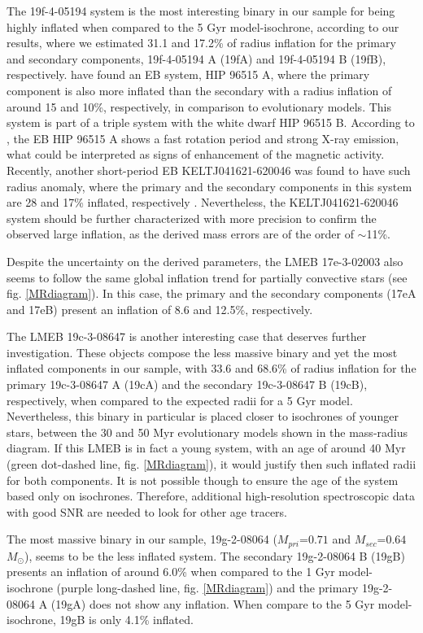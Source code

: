 \documentclass[fleqn,usenatbib]{mnras}
\begin{document}
The 19f-4-05194 system is the most interesting binary in our sample for being highly inflated when compared to the 5 Gyr model-isochrone, according to our results, where we estimated 31.1 and 17.2\% of radius inflation for the primary and secondary components, 19f-4-05194 A (19fA) and 19f-4-05194 B (19fB), respectively. \citet{Huelamo09} have found an EB system, HIP 96515 A, where the primary component is also more inflated than the secondary with a radius inflation of around 15 and 10\%, respectively, in comparison to evolutionary models. This system is part of a triple system with the white dwarf HIP 96515 B. According to \citet{Huelamo09}, the EB HIP 96515 A shows a fast rotation period and strong X-ray emission, what could be interpreted as signs of enhancement of the magnetic activity. 
Recently, another short-period EB KELTJ041621-620046 was found to have such radius anomaly, where the primary and the secondary components in this system are 28 and 17\% inflated, respectively \citep{Lubin17}. Nevertheless, the KELTJ041621-620046 system should be further characterized with more precision to confirm the observed large inflation, as the derived mass errors are of the order of $\sim$11\%.

Despite the uncertainty on the derived parameters, the LMEB 17e-3-02003 also seems to follow the same global inflation trend for partially convective stars (see fig. \ref{MRdiagram}). In this case, the primary and the secondary components (17eA and 17eB) present an inflation of 8.6 and 12.5\%, respectively.

The LMEB 19c-3-08647 is another interesting case that deserves further investigation. These objects compose the less massive binary and yet the most inflated components in our sample, with 33.6 and 68.6\% of radius inflation for the primary 19c-3-08647 A (19cA) and the secondary 19c-3-08647 B (19cB), respectively, when compared to the expected radii for a 5 Gyr model. Nevertheless, this binary in particular is placed closer to isochrones of younger stars, between the 30 and 50 Myr evolutionary models shown in the mass-radius diagram. If this LMEB is in fact a young system, with an age of around 40 Myr (green dot-dashed line, fig. \ref{MRdiagram}), it would justify then such inflated radii for both components. 
It is not possible though to ensure the age of the system based only on isochrones. 
Therefore, additional high-resolution spectroscopic data with good SNR are needed to look for other age tracers.

The most massive binary in our sample, 19g-2-08064 ($M_{pri}$=$0.71$ and $M_{sec}$=$0.64$ $M_{\odot}$), seems to be the less inflated system. The secondary 19g-2-08064 B (19gB) presents an inflation of around 6.0\% when compared to the 1 Gyr model-isochrone (purple long-dashed line, fig. \ref{MRdiagram}) and the primary 19g-2-08064 A (19gA) does not show any inflation. When compare to the 5 Gyr model-isochrone, 19gB is only 4.1\% inflated.
\end{document}
